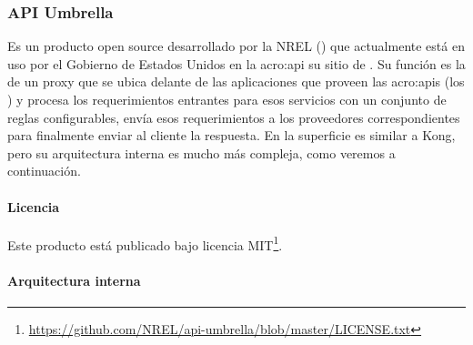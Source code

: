\subsubsection{API Umbrella}
\label{soa:tecnologias:api-umbrella}

Es un producto open source desarrollado por la NREL () que actualmente está en uso por el Gobierno de Estados Unidos en la \gls{acro:api} su sitio de . Su función es la de un proxy que se ubica delante de las aplicaciones que proveen las \glspl{acro:api} (los ) y procesa los requerimientos entrantes para esos servicios con un conjunto de reglas configurables, envía esos requerimientos a los proveedores correspondientes para finalmente enviar al cliente la respuesta. En la superficie es similar a Kong, pero su arquitectura interna es mucho más compleja, como veremos a continuación.

\paragraph{Licencia}

Este producto está publicado bajo licencia MIT\footnote{\url{https://github.com/NREL/api-umbrella/blob/master/LICENSE.txt}}.

\paragraph{Arquitectura interna}

